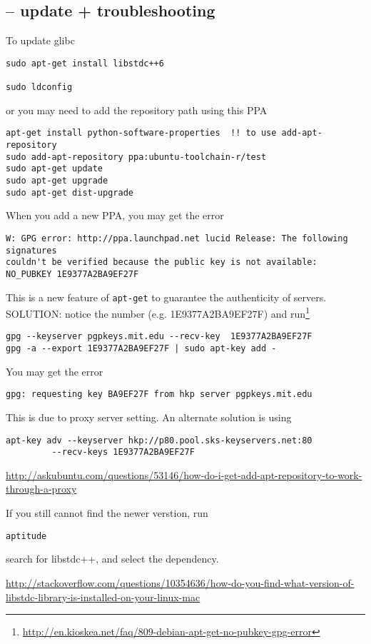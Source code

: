 \subsection{-- update + troubleshooting}

To update glibc
\begin{verbatim}
sudo apt-get install libstdc++6

sudo ldconfig
\end{verbatim}
or you may need to add the repository path using this PPA 
\begin{verbatim}
apt-get install python-software-properties  !! to use add-apt-repository
sudo add-apt-repository ppa:ubuntu-toolchain-r/test 
sudo apt-get update
sudo apt-get upgrade
sudo apt-get dist-upgrade
\end{verbatim} 

When you add a new PPA, you may get the error
\begin{verbatim}
W: GPG error: http://ppa.launchpad.net lucid Release: The following signatures
couldn't be verified because the public key is not available: NO_PUBKEY 1E9377A2BA9EF27F
\end{verbatim}
This is a new feature of \verb!apt-get! to guarantee the authenticity of
servers. SOLUTION: notice the number (e.g. 1E9377A2BA9EF27F) and
run\footnote{\url{http://en.kioskea.net/faq/809-debian-apt-get-no-pubkey-gpg-error}}
\begin{verbatim}
gpg --keyserver pgpkeys.mit.edu --recv-key  1E9377A2BA9EF27F     
gpg -a --export 1E9377A2BA9EF27F | sudo apt-key add -
\end{verbatim}
You may get the error
\begin{verbatim}
gpg: requesting key BA9EF27F from hkp server pgpkeys.mit.edu
\end{verbatim}
This is due to proxy server setting. An alternate solution is using
\begin{verbatim}
apt-key adv --keyserver hkp://p80.pool.sks-keyservers.net:80
         --recv-keys 1E9377A2BA9EF27F
\end{verbatim}
\url{http://askubuntu.com/questions/53146/how-do-i-get-add-apt-repository-to-work-through-a-proxy}

If you still cannot find the newer verstion, run
\begin{verbatim}
aptitude
\end{verbatim}
search for libstdc++, and select the dependency.

\url{http://stackoverflow.com/questions/10354636/how-do-you-find-what-version-of-libstdc-library-is-installed-on-your-linux-mac}

